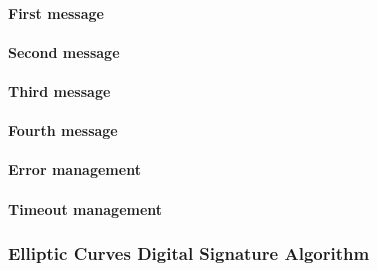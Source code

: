 \documentclass[a4paper,12pt]{article}
\begin{document}
\paragraph{First message}
\paragraph{Second message}
\paragraph{Third message}
\paragraph{Fourth message}
\paragraph{Error management}
\paragraph{Timeout management}
\subsubsection{Elliptic Curves Digital Signature Algorithm}
\end{document}
